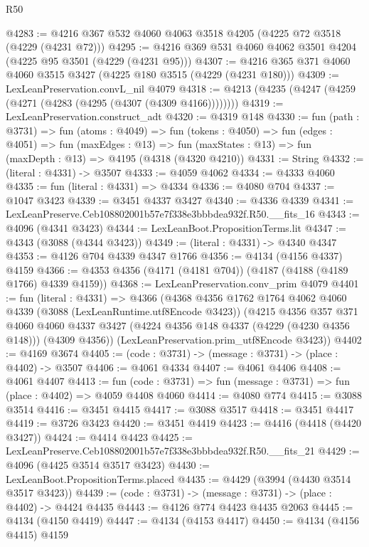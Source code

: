 \begin{lexlean}{R50}
\begin{coremodule}
@4283 := @4216 @367 @532 @4060 @4063 @3518 @4205 (@4225 @72 @3518 (@4229 (@4231 @72)))
@4295 := @4216 @369 @531 @4060 @4062 @3501 @4204 (@4225 @95 @3501 (@4229 (@4231 @95)))
@4307 := @4216 @365 @371 @4060 @4060 @3515 @3427 (@4225 @180 @3515 (@4229 (@4231 @180)))
@4309 := LexLeanPreservation.convL_nil @4079
@4318 := @4213 (@4235 (@4247 (@4259 (@4271 (@4283 (@4295 (@4307 (@4309 @4166))))))))
@4319 := LexLeanPreservation.construct_adt
@4320 := @4319 @148
@4330 := fun (path : @3731) =>
  fun (atoms : @4049) =>
  fun (tokens : @4050) =>
  fun (edges : @4051) =>
  fun (maxEdges : @13) =>
  fun (maxStates : @13) => fun (maxDepth : @13) => @4195 (@4318 (@4320 @4210))
@4331 := String
@4332 := (literal : @4331) -> @3507
@4333 := @4059 @4062
@4334 := @4333 @4060
@4335 := fun (literal : @4331) => @4334
@4336 := @4080 @704
@4337 := @1047 @3423
@4339 := @3451 @4337 @3427
@4340 := @4336 @4339
@4341 := LexLeanPreserve.Ceb108802001b57e7f338e3bbbdea932f.R50.__fits_16
@4343 := @4096 (@4341 @3423)
@4344 := LexLeanBoot.PropositionTerms.lit
@4347 := @4343 (@3088 (@4344 @3423))
@4349 := (literal : @4331) -> @4340 @4347
@4353 := @4126 @704 @4339 @4347 @1766
@4356 := @4134 (@4156 @4337) @4159
@4366 := @4353 @4356 (@4171 (@4181 @704)) (@4187 (@4188 (@4189 @1766) @4339 @4159))
@4368 := LexLeanPreservation.conv_prim @4079
@4401 := fun (literal : @4331) =>
  @4366
    (@4368
      @4356
      @1762
      @1764
      @4062
      @4060
      @4339
      (@3088 (LexLeanRuntime.utf8Encode @3423))
      (@4215
        @4356
        @357
        @371
        @4060
        @4060
        @4337
        @3427
        (@4224 @4356 @148 @4337 (@4229 (@4230 @4356 @148)))
        (@4309 @4356))
      (LexLeanPreservation.prim_utf8Encode @3423))
@4402 := @4169 @3674
@4405 := (code : @3731) -> (message : @3731) -> (place : @4402) -> @3507
@4406 := @4061 @4334
@4407 := @4061 @4406
@4408 := @4061 @4407
@4413 := fun (code : @3731) => fun (message : @3731) => fun (place : @4402) => @4059 @4408 @4060
@4414 := @4080 @774
@4415 := @3088 @3514
@4416 := @3451 @4415
@4417 := @3088 @3517
@4418 := @3451 @4417
@4419 := @3726 @3423
@4420 := @3451 @4419
@4423 := @4416 (@4418 (@4420 @3427))
@4424 := @4414 @4423
@4425 := LexLeanPreserve.Ceb108802001b57e7f338e3bbbdea932f.R50.__fits_21
@4429 := @4096 (@4425 @3514 @3517 @3423)
@4430 := LexLeanBoot.PropositionTerms.placed
@4435 := @4429 (@3994 (@4430 @3514 @3517 @3423))
@4439 := (code : @3731) -> (message : @3731) -> (place : @4402) -> @4424 @4435
@4443 := @4126 @774 @4423 @4435 @2063
@4445 := @4134 (@4150 @4419)
@4447 := @4134 (@4153 @4417)
@4450 := @4134 (@4156 @4415) @4159

\end{coremodule}
\end{lexlean}
